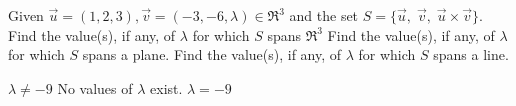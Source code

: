 
\begin{Exercise}[
name={},
title={}, 
difficulty=0,
origin={\cite{YL}}]
Given $\vec{u}=(1,2,3), \vec{v}=(-3,-6,\lambda)\in\Re^3$ and the set
$S=\{\vec{u},\; \vec{v},\; \vec{u}\times \vec{v}\}$.
\Question Find the value(s), if any, of $\lambda$ for
which $S$ spans $\Re^3$
\Question Find the value(s), if any, of $\lambda$ for
which $S$ spans a plane.
\Question Find the value(s), if any, of $\lambda$ for
which $S$ spans a line.

\end{Exercise}

\begin{Answer}
\begin{multicols}{3}
\Question $\lambda\neq -9$
\Question No values of $\lambda$ exist.
\Question $\lambda= -9$
\EndCurrentQuestion
\end{multicols}
\end{Answer}
